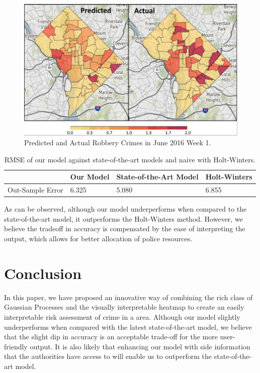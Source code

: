 \documentclass[letterpaper]{article}
\begin{document}
	\begin{figure}[!ht]
		\includegraphics[width=\linewidth]{./p2.png}
		\caption{Predicted and Actual Robbery Crimes in June 2016 Week 1.}
		\label{p2}
	\end{figure}

	\begin{table}[!ht]
		\begin{tabular}{| p{1cm} | l | p{2cm} | p{1.5cm} | }
		\hline
		& Our Model & State-of-the-Art Model & Holt-Winters \\ \hline
		Out-Sample Error & 6.325 & 5.080 & 6.855\\
		\hline
		\end{tabular}
		\caption{RMSE of our model against state-of-the-art models and naive with Holt-Winters.}
		\label{t2}
	\end{table}

	As can be observed, although our model underperforms when compared to the state-of-the-art model, it outperforms the Holt-Winters method.
	However, we believe the  tradeoff in accuracy is compensated by the ease of interpreting the output, which allows for better allocation of police resources.
	
	\section{Conclusion}
	In this paper, we have proposed an innovative way of combining the rich class of Gaussian Processes and the visually interpretable heatmap to create an easily interpretable risk assessment of crime in a area.
	Although our model slightly underperforms when compared with the latest state-of-the-art model, we believe that the slight dip in accuracy is an acceptable trade-off for the more user-friendly output.
	It is also likely that enhancing our model with side information that the authorities have access to will enable us to outperform the state-of-the-art model.
	
\end{document}
